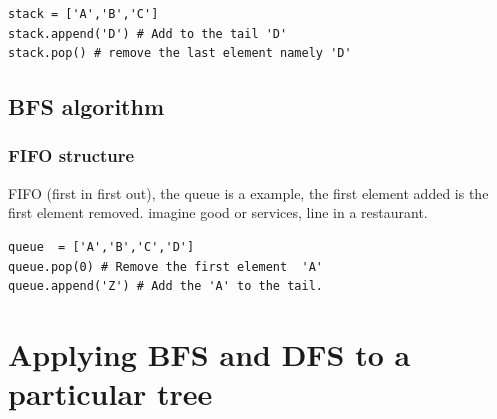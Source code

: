 \documentclass[10pt,a4paper]{article}
\begin{document}
\begin{lstlisting}
stack = ['A','B','C']
stack.append('D') # Add to the tail 'D'
stack.pop() # remove the last element namely 'D'
\end{lstlisting}



\subsection{BFS algorithm}


\subsubsection{FIFO structure}
FIFO (first in first out), the queue is a example, the first element added is the first element removed.
imagine good or services, line in a restaurant.


\begin{lstlisting}
queue  = ['A','B','C','D']
queue.pop(0) # Remove the first element  'A'
queue.append('Z') # Add the 'A' to the tail.
\end{lstlisting}





\section{Applying BFS and DFS to a particular tree}
\end{document}
